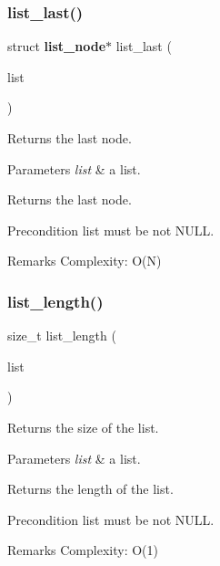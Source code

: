 \subsubsection{list\+\_\+last()}
{\footnotesize\ttfamily struct \textbf{ list\+\_\+node}$\ast$ list\+\_\+last (\begin{DoxyParamCaption}\item[{const struct \textbf{ list} $\ast$}]{list }\end{DoxyParamCaption})}

Returns the last node.


\begin{DoxyParams}{Parameters}
{\em list} & a list. \\
\hline
\end{DoxyParams}
\begin{DoxyReturn}{Returns}
the last node.
\end{DoxyReturn}
\begin{DoxyPrecond}{Precondition}
{\ttfamily list} must be not N\+U\+LL.
\end{DoxyPrecond}
\begin{DoxyRemark}{Remarks}
Complexity\+: O(\+N) 
\end{DoxyRemark}
\mbox{\label{list_8h_a5ded68cde03f48a724bb04326dc5cc87}} 
\subsubsection{list\+\_\+length()}
{\footnotesize\ttfamily size\+\_\+t list\+\_\+length (\begin{DoxyParamCaption}\item[{const struct \textbf{ list} $\ast$}]{list }\end{DoxyParamCaption})\hspace{0.3cm}{\ttfamily [inline]}}

Returns the size of the list.


\begin{DoxyParams}{Parameters}
{\em list} & a list. \\
\hline
\end{DoxyParams}
\begin{DoxyReturn}{Returns}
the length of the list.
\end{DoxyReturn}
\begin{DoxyPrecond}{Precondition}
{\ttfamily list} must be not N\+U\+LL.
\end{DoxyPrecond}
\begin{DoxyRemark}{Remarks}
Complexity\+: O(1) 
\end{DoxyRemark}
\mbox{\label{list_8h_aa2253e2e4f2da4eb7a3b17759369dcd7}} 
